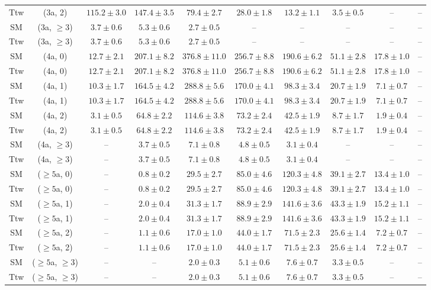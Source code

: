 \begin{table}[h!]
{\begin{tabular}{cccccccccc}
	Ttw & (3a, 2) & $115.2\pm 3.0$ & $147.4\pm 3.5$ & $79.4\pm 2.7$ & $28.0\pm 1.8$ & $13.2\pm 1.1$ & $3.5\pm 0.5$ & -- & -- \\[0.5ex] 
	SM & (3a, $\ge3$) & $3.7\pm 0.6$ & $5.3\pm 0.6$ & $2.7\pm 0.5$ & -- & -- & -- & -- & -- \\[0.5ex] 
	Ttw & (3a, $\ge3$) & $3.7\pm 0.6$ & $5.3\pm 0.6$ & $2.7\pm 0.5$ & -- & -- & -- & -- & -- \\[0.5ex] 
	SM & (4a, 0) & $12.7\pm 2.1$ & $207.1\pm 8.2$ & $376.8\pm 11.0$ & $256.7\pm 8.8$ & $190.6\pm 6.2$ & $51.1\pm 2.8$ & $17.8\pm 1.0$ & -- \\[0.5ex] 
	Ttw & (4a, 0) & $12.7\pm 2.1$ & $207.1\pm 8.2$ & $376.8\pm 11.0$ & $256.7\pm 8.8$ & $190.6\pm 6.2$ & $51.1\pm 2.8$ & $17.8\pm 1.0$ & -- \\[0.5ex] 
	SM & (4a, 1) & $10.3\pm 1.7$ & $164.5\pm 4.2$ & $288.8\pm 5.6$ & $170.0\pm 4.1$ & $98.3\pm 3.4$ & $20.7\pm 1.9$ & $7.1\pm 0.7$ & -- \\[0.5ex] 
	Ttw & (4a, 1) & $10.3\pm 1.7$ & $164.5\pm 4.2$ & $288.8\pm 5.6$ & $170.0\pm 4.1$ & $98.3\pm 3.4$ & $20.7\pm 1.9$ & $7.1\pm 0.7$ & -- \\[0.5ex] 
	SM & (4a, 2) & $3.1\pm 0.5$ & $64.8\pm 2.2$ & $114.6\pm 3.8$ & $73.2\pm 2.4$ & $42.5\pm 1.9$ & $8.7\pm 1.7$ & $1.9\pm 0.4$ & -- \\[0.5ex] 
	Ttw & (4a, 2) & $3.1\pm 0.5$ & $64.8\pm 2.2$ & $114.6\pm 3.8$ & $73.2\pm 2.4$ & $42.5\pm 1.9$ & $8.7\pm 1.7$ & $1.9\pm 0.4$ & -- \\[0.5ex] 
	SM & (4a, $\ge3$) & -- & $3.7\pm 0.5$ & $7.1\pm 0.8$ & $4.8\pm 0.5$ & $3.1\pm 0.4$ & -- & -- & -- \\[0.5ex] 
	Ttw & (4a, $\ge3$) & -- & $3.7\pm 0.5$ & $7.1\pm 0.8$ & $4.8\pm 0.5$ & $3.1\pm 0.4$ & -- & -- & -- \\[0.5ex] 
	SM & ($\ge5$a, 0) & -- & $0.8\pm 0.2$ & $29.5\pm 2.7$ & $85.0\pm 4.6$ & $120.3\pm 4.8$ & $39.1\pm 2.7$ & $13.4\pm 1.0$ & -- \\[0.5ex] 
	Ttw & ($\ge5$a, 0) & -- & $0.8\pm 0.2$ & $29.5\pm 2.7$ & $85.0\pm 4.6$ & $120.3\pm 4.8$ & $39.1\pm 2.7$ & $13.4\pm 1.0$ & -- \\[0.5ex] 
	SM & ($\ge5$a, 1) & -- & $2.0\pm 0.4$ & $31.3\pm 1.7$ & $88.9\pm 2.9$ & $141.6\pm 3.6$ & $43.3\pm 1.9$ & $15.2\pm 1.1$ & -- \\[0.5ex] 
	Ttw & ($\ge5$a, 1) & -- & $2.0\pm 0.4$ & $31.3\pm 1.7$ & $88.9\pm 2.9$ & $141.6\pm 3.6$ & $43.3\pm 1.9$ & $15.2\pm 1.1$ & -- \\[0.5ex] 
	SM & ($\ge5$a, 2) & -- & $1.1\pm 0.6$ & $17.0\pm 1.0$ & $44.0\pm 1.7$ & $71.5\pm 2.3$ & $25.6\pm 1.4$ & $7.2\pm 0.7$ & -- \\[0.5ex] 
	Ttw & ($\ge5$a, 2) & -- & $1.1\pm 0.6$ & $17.0\pm 1.0$ & $44.0\pm 1.7$ & $71.5\pm 2.3$ & $25.6\pm 1.4$ & $7.2\pm 0.7$ & -- \\[0.5ex] 
	SM & ($\ge5$a, $\ge3$) & -- & -- & $2.0\pm 0.3$ & $5.1\pm 0.6$ & $7.6\pm 0.7$ & $3.3\pm 0.5$ & -- & -- \\[0.5ex] 
	Ttw & ($\ge5$a, $\ge3$) & -- & -- & $2.0\pm 0.3$ & $5.1\pm 0.6$ & $7.6\pm 0.7$ & $3.3\pm 0.5$ & -- & -- \\[0.5ex] 
	\hline
	\hline
\end{tabular}}
\end{table}

